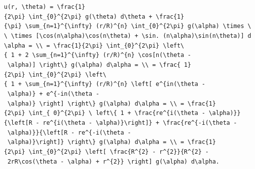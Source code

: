 \documentclass[
  ukrainian,
]{article}
\begin{document}
\texttt{u(r,\ \textbackslash{}theta)\ =\ \textbackslash{}frac\{1\}\{2\textbackslash{}pi\}\ \textbackslash{}int\_\{0\}\^{}\{2\textbackslash{}pi\}\ g(\textbackslash{}theta)\ d\textbackslash{}theta\ +\ \textbackslash{}frac\{1\}\{\textbackslash{}pi\}\ \textbackslash{}sum\_\{n=1\}\^{}\{\textbackslash{}infty\}\ (r/R)\^{}\{n\}\ \textbackslash{}int\_\{0\}\^{}\{2\textbackslash{}pi\}\ g(\textbackslash{}alpha)\ \textbackslash{}times\ \textbackslash{}\textbackslash{}\ \textbackslash{}times\ {[}\textbackslash{}cos(n\textbackslash{}alpha)\textbackslash{}cos(n\textbackslash{}theta)\ +\ \textbackslash{}sin.\ (n\textbackslash{}alpha)\textbackslash{}sin(n\textbackslash{}theta){]}\ d\textbackslash{}alpha\ =\ \textbackslash{}\textbackslash{}\ =\ \textbackslash{}frac\{1\}\{2\textbackslash{}pi\}\ \textbackslash{}int\_\{0\}\^{}\{2\textbackslash{}pi\}\ \textbackslash{}left\textbackslash{}\{\ 1\ +\ 2\ \textbackslash{}sum\_\{n=1\}\^{}\{\textbackslash{}infty\}\ (r/R)\^{}\{n\}\ \textbackslash{}cos{[}n(\textbackslash{}theta\ -\ \textbackslash{}alpha){]}\ \textbackslash{}right\textbackslash{}\}\ g(\textbackslash{}alpha)\ d\textbackslash{}alpha\ =\ \textbackslash{}\textbackslash{}\ =\ \textbackslash{}frac\{\ 1\}\{2\textbackslash{}pi\}\ \textbackslash{}int\_\{0\}\^{}\{2\textbackslash{}pi\}\ \textbackslash{}left\textbackslash{}\{\ 1\ +\ \textbackslash{}sum\_\{n=1\}\^{}\{\textbackslash{}infty\}\ (r/R)\^{}\{n\}\ \textbackslash{}left{[}\ e\^{}\{in(\textbackslash{}theta\ -\ \textbackslash{}alpha)\}\ +\ e\^{}\{-in(\textbackslash{}theta\ -\ \textbackslash{}alpha)\}\ \textbackslash{}right{]}\ \textbackslash{}right\textbackslash{}\}\ g(\textbackslash{}alpha)\ d\textbackslash{}alpha\ =\ \textbackslash{}\textbackslash{}\ =\ \textbackslash{}frac\{1\}\{2\textbackslash{}pi\}\ \textbackslash{}int\_\{\ 0\}\^{}\{2\textbackslash{}pi\}\ \textbackslash{}\ left\textbackslash{}\{\ 1\ +\ \textbackslash{}frac\{re\^{}\{i(\textbackslash{}theta\ -\ \textbackslash{}alpha)\}\}\{\textbackslash{}left{[}R\ -\ re\^{}\{i(\textbackslash{}theta\ -\ \textbackslash{}alpha)\}\textbackslash{}right{]}\}\ +\ \textbackslash{}frac\{re\^{}\{-i(\textbackslash{}theta\ -\ \textbackslash{}alpha)\}\}\{\textbackslash{}left{[}R\ -\ re\^{}\{-i(\textbackslash{}theta\ -\ \textbackslash{}alpha)\}\textbackslash{}right{]}\}\ \textbackslash{}right\textbackslash{}\}\ g(\textbackslash{}alpha)\ d\textbackslash{}alpha\ =\ \textbackslash{}\textbackslash{}\ =\ \textbackslash{}frac\{1\}\{2\textbackslash{}pi\}\ \textbackslash{}int\_\{0\}\^{}\{2\textbackslash{}pi\}\ \textbackslash{}left{[}\ \textbackslash{}frac\{R\^{}\{2\}\ -\ r\^{}\{2\}\}\{R\^{}\{2\}\ -\ 2rR\textbackslash{}cos(\textbackslash{}theta\ -\ \textbackslash{}alpha)\ +\ r\^{}\{2\}\}\ \textbackslash{}right{]}\ g(\textbackslash{}alpha)\ d\textbackslash{}alpha.}
\end{document}
